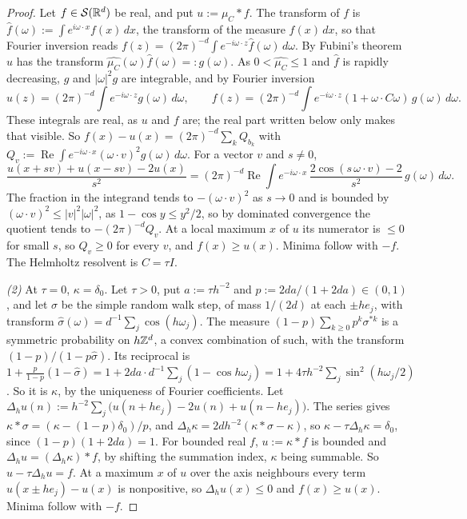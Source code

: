 \begin{proof}
Let $f \in \mathcal{S}(\mathbb{R}^d)$ be real, and put $u := \mu_C * f$. The transform of $f$ is
$\widehat f(\omega) := \int e^{i\omega\cdot x}f(x)\,dx$, the transform of the measure $f(x)\,dx$, so
that Fourier inversion reads
$f(z) = (2\pi)^{-d}\int e^{-i\omega\cdot z}\widehat f(\omega)\,d\omega$. By Fubini's theorem $u$ has
the transform $\widehat{\mu_C}(\omega)\widehat f(\omega) =: g(\omega)$. As
$0 < \widehat{\mu_C} \le 1$ and $\widehat f$ is rapidly
decreasing, $g$ and $|\omega|^2g$ are integrable, and by Fourier inversion
\[
  u(z) = (2\pi)^{-d}\int e^{-i\omega\cdot z}g(\omega)\,d\omega, \qquad
  f(z) = (2\pi)^{-d}\int e^{-i\omega\cdot z}(1 + \omega\cdot C\omega)\,g(\omega)\,
  d\omega .
\]
These integrals are real, as $u$ and $f$ are; the real part written below only makes that
visible. So $f(x) - u(x) = (2\pi)^{-d}\sum_kQ_{b_k}$ with $Q_v := \operatorname{Re}\int e^{-i\omega\cdot x}
(\omega\cdot v)^2g(\omega)\,d\omega$. For a vector $v$ and $s \ne 0$,
\[
  \frac{u(x + sv) + u(x - sv) - 2u(x)}{s^2} = (2\pi)^{-d}\operatorname{Re}\int e^{-i\omega\cdot x}\,
  \frac{2\cos(s\,\omega\cdot v) - 2}{s^2}\,g(\omega)\,d\omega .
\]
The fraction in the integrand tends to $-(\omega\cdot v)^2$ as $s \to 0$ and is bounded by
$(\omega\cdot v)^2 \le |v|^2|\omega|^2$, as $1 - \cos y \le y^2/2$, so by dominated convergence the
quotient tends to $-(2\pi)^{-d}Q_v$. At a local maximum $x$ of $u$ its numerator is $\le 0$ for
small $s$, so $Q_v \ge 0$ for every $v$, and $f(x) \ge u(x)$. Minima follow with $-f$. The
Helmholtz resolvent is $C = \tau I$.

\emph{(2)} At $\tau = 0$, $\kappa = \delta_0$. Let $\tau > 0$, put $a := \tau h^{-2}$ and
$p := 2da/(1 + 2da) \in (0, 1)$, and let $\sigma$ be the simple random walk step, of mass $1/(2d)$ at
each $\pm he_j$, with transform $\widehat\sigma(\omega) = d^{-1}\sum_j\cos(h\omega_j)$. The
measure $(1 - p)\sum_{k \ge 0}p^k\sigma^{*k}$ is a symmetric probability on $h\mathbb{Z}^d$, a convex
combination of such, with the transform $(1 - p)/(1 - p\widehat\sigma)$. Its reciprocal is
$1 + \frac{p}{1 - p}(1 - \widehat\sigma) = 1 + 2da\cdot d^{-1}\sum_j(1 - \cos h\omega_j) =
1 + 4\tau h^{-2}\sum_j\sin^2(h\omega_j/2)$. So it is $\kappa$, by the uniqueness of Fourier
coefficients.
Let $\Delta_hu(n) := h^{-2}\sum_j\bigl(u(n + he_j) - 2u(n) + u(n - he_j)\bigr)$. The series gives
$\kappa * \sigma = (\kappa - (1 - p)\delta_0)/p$, and $\Delta_h\kappa = 2dh^{-2}(\kappa * \sigma -
\kappa)$, so $\kappa - \tau\Delta_h\kappa = \delta_0$, since $(1 - p)(1 + 2da) = 1$. For bounded real
$f$, $u := \kappa * f$ is bounded and $\Delta_hu = (\Delta_h\kappa) * f$, by shifting the summation
index, $\kappa$ being summable. So $u - \tau\Delta_hu = f$. At a maximum $x$ of $u$ over the axis
neighbours every term $u(x \pm he_j) - u(x)$ is nonpositive, so $\Delta_hu(x) \le 0$ and
$f(x) \ge u(x)$. Minima follow with $-f$.


\end{proof}

